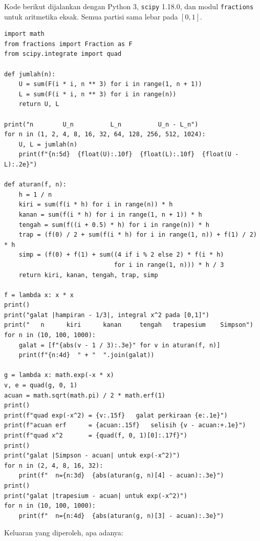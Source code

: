 Kode berikut dijalankan dengan Python 3, \texttt{scipy} 1.18.0, dan modul
\texttt{fractions} untuk aritmetika eksak. Semua partisi sama lebar pada $[0,1]$.

\begin{lab}
\begin{verbatim}
import math
from fractions import Fraction as F
from scipy.integrate import quad

def jumlah(n):
    U = sum(F(i * i, n ** 3) for i in range(1, n + 1))
    L = sum(F(i * i, n ** 3) for i in range(n))
    return U, L

print("n        U_n          L_n          U_n - L_n")
for n in (1, 2, 4, 8, 16, 32, 64, 128, 256, 512, 1024):
    U, L = jumlah(n)
    print(f"{n:5d}  {float(U):.10f}  {float(L):.10f}  {float(U - L):.2e}")

def aturan(f, n):
    h = 1 / n
    kiri = sum(f(i * h) for i in range(n)) * h
    kanan = sum(f(i * h) for i in range(1, n + 1)) * h
    tengah = sum(f((i + 0.5) * h) for i in range(n)) * h
    trap = (f(0) / 2 + sum(f(i * h) for i in range(1, n)) + f(1) / 2) * h
    simp = (f(0) + f(1) + sum((4 if i % 2 else 2) * f(i * h)
                              for i in range(1, n))) * h / 3
    return kiri, kanan, tengah, trap, simp

f = lambda x: x * x
print()
print("galat |hampiran - 1/3|, integral x^2 pada [0,1]")
print("   n      kiri      kanan     tengah   trapesium    Simpson")
for n in (10, 100, 1000):
    galat = [f"{abs(v - 1 / 3):.3e}" for v in aturan(f, n)]
    print(f"{n:4d}  " + "  ".join(galat))

g = lambda x: math.exp(-x * x)
v, e = quad(g, 0, 1)
acuan = math.sqrt(math.pi) / 2 * math.erf(1)
print()
print(f"quad exp(-x^2) = {v:.15f}   galat perkiraan {e:.1e}")
print(f"acuan erf      = {acuan:.15f}   selisih {v - acuan:+.1e}")
print(f"quad x^2       = {quad(f, 0, 1)[0]:.17f}")
print()
print("galat |Simpson - acuan| untuk exp(-x^2)")
for n in (2, 4, 8, 16, 32):
    print(f"  n={n:3d}  {abs(aturan(g, n)[4] - acuan):.3e}")
print()
print("galat |trapesium - acuan| untuk exp(-x^2)")
for n in (10, 100, 1000):
    print(f"  n={n:4d}  {abs(aturan(g, n)[3] - acuan):.3e}")
\end{verbatim}
\end{lab}

Keluaran yang diperoleh, apa adanya:

